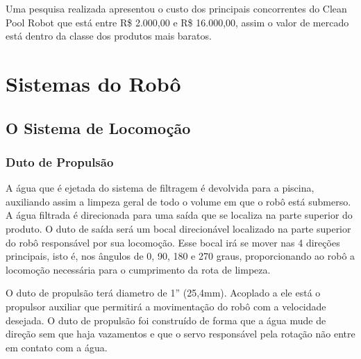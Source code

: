 Uma pesquisa realizada apresentou o custo dos principais concorrentes do Clean Pool Robot que está entre R\$ 2.000,00 e R\$ 16.000,00, assim o valor de mercado está dentro da classe dos produtos mais baratos.

\chapter{Sistemas do Robô}
\section{O Sistema de Locomoção}
\subsection{Duto de Propulsão}
A água que é ejetada do sistema de filtragem é devolvida para a piscina, auxiliando assim a limpeza geral de todo o volume em que o robô está submerso. A água filtrada é direcionada para uma saída que se localiza na parte superior do produto. O duto de saída será um bocal direcionável localizado na parte superior do robô responsável por sua locomoção. Esse bocal irá se mover nas 4 direções principais, isto é, nos ângulos de 0, 90, 180 e 270 graus, proporcionando ao robô a locomoção necessária para o cumprimento da rota de limpeza.

O duto de propulsão terá diametro de 1” (25,4mm). Acoplado a ele está o propulsor auxiliar que permitirá a movimentação do robô com a velocidade desejada. O duto de propulsão foi construído de forma que a água mude de direção sem que haja vazamentos e que o servo responsável pela rotação não entre em contato com a água.

